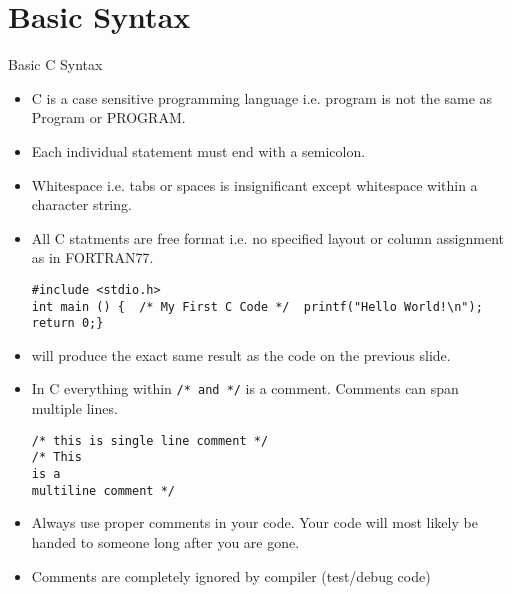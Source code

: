 \documentclass[10pt,t]{beamer}
\begin{document}
\section{Basic Syntax}
\begin{frame}{Basic C Syntax}
  \begin{itemize}
    \item C is a case sensitive programming language i.e. program is not the same as Program or PROGRAM.
    \item Each individual statement must end with a semicolon. 
    \item Whitespace i.e. tabs or spaces is insignificant except whitespace within a character string.
    \item All C statments are free format i.e. no specified layout or column assignment as in FORTRAN77.
      \begin{lstlisting}
#include <stdio.h>
int main () {  /* My First C Code */  printf("Hello World!\n");  return 0;}
      \end{lstlisting}
    \item[] will produce the exact same result as the code on the previous slide.
    \item In C everything within \lstinline|/* and */| is a comment. Comments can span multiple lines.
      \begin{lstlisting}
/* this is single line comment */
/* This
is a 
multiline comment */
      \end{lstlisting}
      \item Always use proper comments in your code. Your code will most likely be handed to someone long after you are gone.
      \item Comments are completely ignored by compiler (test/debug code)
  \end{itemize}
\end{frame}
\end{document}

